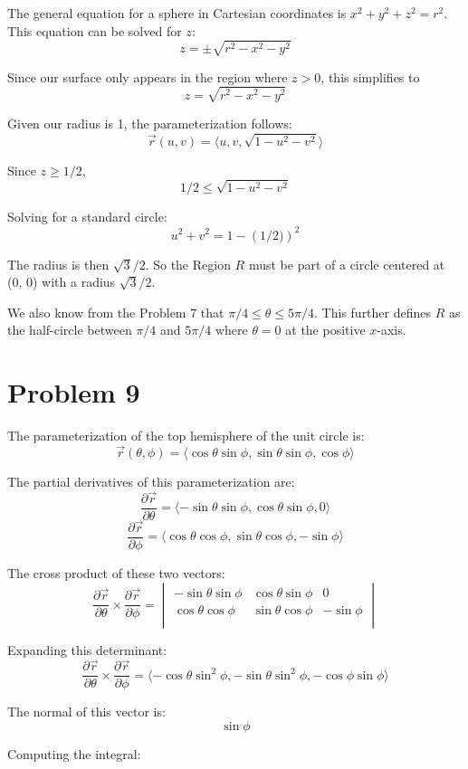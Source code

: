 \documentclass{article}
\begin{document}
The general equation for a sphere in Cartesian coordinates is $x^2 + y^2 + z^2 =
r^2$. This equation can be solved for $z$:
$$ z = \pm \sqrt{r^2 - x^2 - y^2} $$

Since our surface only appears in the region where $z > 0$, this simplifies to 
$$ z = \sqrt{r^2 - x^2 - y^2} $$

Given our radius is 1, the parameterization follows:
$$ \vec{r}(u, v) = \langle u, v, \sqrt{1 - u^2 - v^2} \rangle $$

Since $z \geq 1/2$, 
$$ 1 / 2 \leq \sqrt{1 - u^2 - v^2} $$

Solving for a standard circle:
$$u^2 + v^2 = 1 - \left(1/2)\right)^2 $$

The radius is then $\sqrt{3} / 2$. So the Region $R$ must be part of a circle
centered at (0, 0) with a radius $\sqrt{3} / 2$.

\bigbreak

We also know from the Problem 7 that $\pi / 4 \leq \theta \leq  5 \pi / 4$. This
further defines $R$ as the half-circle between $\pi / 4$ and $5 \pi / 4$ where
$\theta = 0$ at the positive $x$-axis.

\section*{Problem 9}

The parameterization of the top hemisphere of the unit circle is:
$$ \vec{r}(\theta, \phi) = \langle \cos \theta \sin \phi, \sin \theta \sin \phi,
\cos \phi \rangle $$

The partial derivatives of this parameterization are:
$$ \frac{\partial \vec{r}}{\partial \theta} = \langle -\sin \theta \sin \phi,
\cos \theta \sin \phi, 0 \rangle $$
$$ \frac{\partial \vec{r}}{\partial \phi} = \langle \cos \theta \cos \phi, \sin
\theta \cos \phi, -\sin \phi \rangle $$

The cross product of these two vectors:
$$ \frac{\partial \vec{r}}{\partial \theta} \times \frac{\partial
\vec{r}}{\partial \phi} =
\begin{vmatrix}
  -\sin \theta \sin \phi & \cos \theta \sin \phi & 0 \\
  \cos \theta \cos \phi & \sin \theta \cos \phi & - \sin \phi \\
\end{vmatrix} $$

Expanding this determinant:
$$ \frac{\partial \vec{r}}{\partial \theta} \times \frac{\partial
\vec{r}}{\partial \phi} = \langle -\cos \theta \sin^2 \phi, -\sin \theta \sin^2
\phi, -\cos \phi \sin \phi \rangle $$

The normal of this vector is:
$$ \sin \phi $$

Computing the integral:
\end{document}
